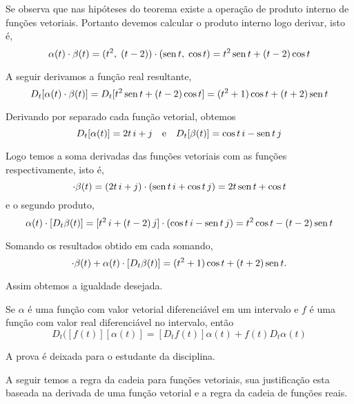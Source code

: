 \solo
Se observa que nas hipóteses do teorema existe a operação de produto interno de funções vetoriais. Portanto devemos calcular o produto interno logo derivar, isto é,
\begin{equation*}
\alpha(t) \cdot \beta(t)=(t^{2},\; (t-2))\cdot (\operatorname{sen} t, \;\cos t )=t^{2}\operatorname{sen} t+(t-2)\cos t
\end{equation*}

A seguir derivamos a função real  resultante,
\begin{equation*}
D_{t}[\alpha(t) \cdot \beta(t)]=D_{t}[t^{2}\operatorname{sen} t+(t-2)\cos t]=(t^{2}+1)\cos t +(t+2)\operatorname{sen} t
\end{equation*}

Derivando por separado cada função vetorial, obtemos
\begin{equation*}
D_{t}[\alpha(t)]=2t\,i+j \quad \text{e}\quad D_{t}[\beta(t)]=\cos t\, i -\operatorname{sen} t\, j
\end{equation*}

Logo temos a soma derivadas das funções vetoriais com as funções respectivamente, isto é,
\begin{equation*}
[D_{t}\alpha(t)]\cdot \beta(t)=(2t\, i +j)\cdot(\sen t\, i+ \cos t\, j )=2t\sen t+ \cos t
\end{equation*}
e o segundo produto,
\begin{equation*}
\alpha(t)\cdot  [D_{t}\beta(t)]=[t^{2}\, i +(t-2)\, j]\cdot (\cos t\, i-\operatorname{sen} t\, j)=t^{2}\cos t-(t-2)\operatorname{sen} t
\end{equation*}

Somando os resultados obtido em cada somando,
\begin{equation*}
[D_{t}\alpha(t)]\cdot \beta(t)+\alpha(t)\cdot  [D_{t}\beta(t)]=(t^{2}+1)\cos t + (t+2)\sen t.
\end{equation*}

Assim obtemos a igualdade desejada.

\begin{teo}\label{thm:14-4-8}
Se \(\alpha\) é uma função com valor vetorial diferenciável em um intervalo e \(f\) é uma função com valor real diferenciável no intervalo, então
\begin{equation*}
D_{t}({[f(t)][\alpha(t)]} = [D_{t}f(t)]\alpha(t) + f(t)D_{t}\alpha(t)
\end{equation*}
\end{teo}

A prova é deixada para o estudante da disciplina.

A seguir temos a regra da cadeia para funções vetoriais, sua justificação esta baseada na derivada de uma função vetorial e a regra da cadeia de funções reais.

